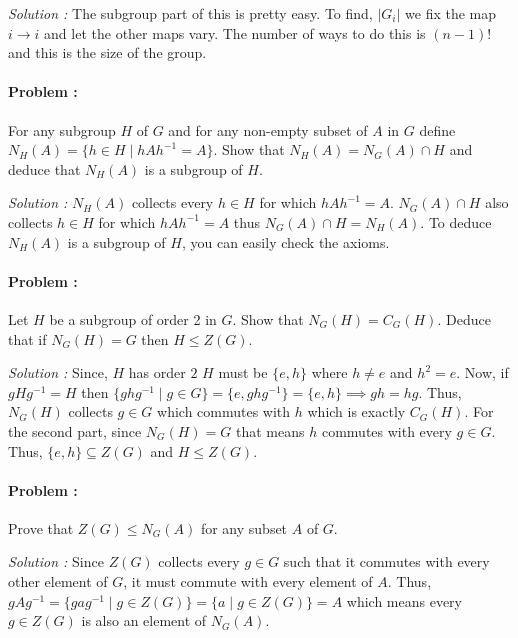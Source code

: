 \vspace{4mm}
\textit{Solution :} The subgroup part of this is pretty easy. To find, $|G_i|$ we fix the map $i \to i$ and let the other maps vary. The number
of ways to do this is $(n-1)!$ and this is the size of the group.

\eject

\paragraph{Problem :} For any subgroup $H$ of $G$ and for any non-empty subset of $A$ in $G$ define $N_H(A)=\{h \in H \mid hAh^{-1}=A\}$.
Show that $N_H(A)= N_G(A) \cap H$ and deduce that $N_H(A)$ is a subgroup of $H$.

\vspace{4mm}
\textit{Solution :} $N_H(A)$ collects every $h \in H$ for which $hAh^{-1}=A$. $N_{G}(A) \cap H$ also collects $h \in H$ for which $hAh^{-1}=A$
thus $N_G(A) \cap H = N_H(A)$. To deduce $N_H(A)$ is a subgroup of $H$, you can easily check the axioms. 

\paragraph{Problem :} Let $H$ be a subgroup of order 2 in $G$. Show that $N_G(H)=C_G(H)$. Deduce that if $N_G(H)=G$ then $H \le Z(G)$.

\vspace{4mm}
\textit{Solution :} Since, $H$ has order $2$ $H$ must be $\{e,h\}$ where $h \neq e $ and $h^2=e$. Now, if $gHg^{-1}=H$ then $\{ghg^{-1} \mid g \in G\}
=\{e,ghg^{-1}\}=\{e,h\} \implies gh=hg$. Thus, $N_G(H)$ collects $g \in G$ which commutes with $h$ which is exactly $C_G(H)$. 
For the second part, since $N_G(H)=G$ that means $h$ commutes with every $g \in G$. Thus, $\{e,h\} \subseteq Z(G)$ and $H \le Z(G)$.

\paragraph{Problem :} Prove that $Z(G) \le N_G(A)$ for any subset $A$ of $G$.

\vspace{4mm}
\textit{Solution :} Since $Z(G)$ collects every $g \in G$ such that it commutes with every other element of $G$, it must commute with 
every element of $A$. Thus, $gAg^{-1}=\{gag^{-1} \mid g \in Z(G)\} = \{a \mid g \in Z(G)\} = A$ which means every $g \in Z(G)$ is also an 
element of $N_G(A)$.  